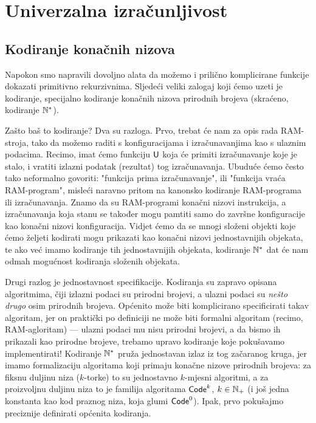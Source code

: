 \chapter{Univerzalna izračunljivost}\label{ch:univ}

\section{Kodiranje konačnih nizova}

Napokon smo napravili dovoljno alata da možemo i prilično komplicirane funkcije dokazati primitivno rekurzivnima. Sljedeći veliki zalogaj koji ćemo uzeti je kodiranje, specijalno kodiranje konačnih nizova prirodnih brojeva (skraćeno, kodiranje ${\mathbb N}^*$).

Zašto baš to kodiranje? Dva su razloga. Prvo, trebat će nam za opis rada RAM-stroja, tako da možemo raditi s konfiguracijama i izračunavanjima kao s ulaznim podacima. Recimo, imat ćemo funkciju $\mathsf U$ koja će primiti izračunavanje koje je stalo, i vratiti izlazni podatak (rezultat) tog izračunavanja. Ubuduće ćemo često tako neformalno govoriti: "funkcija prima izračunavanje", ili "funkcija vraća RAM-program", misleći naravno pritom na kanonsko kodiranje RAM-programa ili izračunavanja. Znamo da su RAM-programi konačni nizovi instrukcija, a izračunavanja koja stanu se također mogu pamtiti samo do završne konfiguracije kao konačni nizovi konfiguracija. Vidjet ćemo da se mnogi složeni objekti koje ćemo željeti kodirati mogu prikazati kao konačni nizovi jednostavnijih objekata, te ako već imamo kodiranje tih jednostavnijih objekata, kodiranje ${\mathbb N}^*$ dat će nam odmah mogućnost kodiranja složenih objekata.

Drugi razlog je jednostavnost specifikacije. Kodiranja su zapravo opisana algoritmima, čiji izlazni podaci su prirodni brojevi, a ulazni podaci su \emph{nešto drugo} osim prirodnih brojeva. Općenito može biti komplicirano specificirati takav algoritam, jer on praktički po definiciji ne može biti formalni algoritam (recimo, RAM-agloritam) --- ulazni podaci mu nisu prirodni brojevi, a da bismo ih prikazali kao prirodne brojeve, trebamo upravo kodiranje koje pokušavamo implementirati! Kodiranje ${\mathbb N}^*$ pruža jednostavan izlaz iz tog začaranog kruga, jer imamo formalizaciju algoritama koji primaju konačne nizove prirodnih brojeva: za fiksnu duljinu niza ($k$-torke) to su jednostavno $k$-mjesni algoritmi, a za proizvoljnu duljinu niza to je familija algoritama $\mathsf{Code}^k$, $k\in{\mathbb N}_+$ (i još jedna konstanta kao kod praznog niza, koja glumi $\mathsf{Code}^0$). Ipak, prvo pokušajmo preciznije definirati općenita kodiranja.

